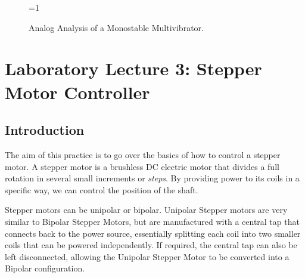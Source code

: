 \documentclass[a4paper, 11pt, oneside]{article}
\begin{document}
\begin{figure}[H]
    \centering
    
    \ifnum\value{ANIMATION}=1 {
    } 
    \fi
    
    \caption{Analog Analysis of a Monostable Multivibrator.}
    \label{fig:555_MONO_ANALOGUE}
\end{figure}

\clearpage


\section{Laboratory Lecture 3: Stepper Motor Controller}

\subsection{Introduction}

The aim of this practice is to go over the basics of how to control a stepper motor. A stepper motor is a brushless DC electric motor that divides a full rotation in several small increments or \textit{steps}. By providing power to its coils in a specific way, we can control the position of the shaft.\medskip

Stepper motors can be unipolar or bipolar. Unipolar Stepper motors are very similar to Bipolar Stepper Motors, but are manufactured with a central tap that connects back to the power source, essentially splitting each coil into two smaller coils that can be powered independently. If required, the central tap can also be left disconnected, allowing the Unipolar Stepper Motor to be converted into a Bipolar configuration.\medskip
\end{document}
